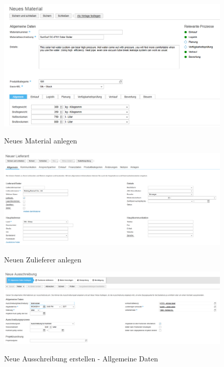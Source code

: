 \begin{figure}[H]
	\begin{center}
	\includegraphics[width=1.0\textwidth]{grafiken/ByDesign-HowTo-1.png}
	\caption{Neues Material anlegen}
	\vspace{-10pt}
	\label{abb:byd-newmaterial}
	\end{center}
\end{figure}

\begin{figure}[H]
	\begin{center}
	\includegraphics[width=1.0\textwidth]{grafiken/ByDesign-HowTo-2.png}
	\caption{Neuen Zulieferer anlegen}
	\vspace{-10pt}
	\label{abb:byd-newsupplier}
	\end{center}
\end{figure}

\begin{figure}[H]
	\begin{center}
	\includegraphics[width=1.0\textwidth]{grafiken/ByDesign-HowTo-Ausschreibung-1.png}
	\caption{Neue Ausschreibung erstellen - Allgemeine Daten}
	\vspace{-10pt}
	\label{abb:byd-rfq-1}
	\end{center}
\end{figure}

